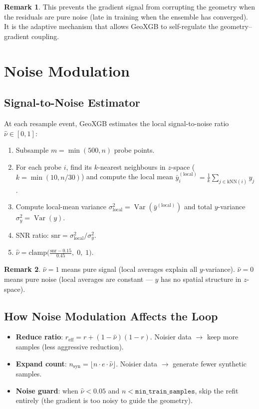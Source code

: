 \documentclass[11pt,a4paper]{article}
\newcommand{\Var}{\operatorname{Var}}
\theoremstyle{definition}
\newtheorem{remark}{Remark}
\begin{document}
\begin{remark}
This prevents the gradient signal from corrupting the geometry when the
residuals are pure noise (late in training when the ensemble has converged).
It is the adaptive mechanism that allows GeoXGB to self-regulate the
geometry--gradient coupling.
\end{remark}


\section{Noise Modulation}
\label{sec:noise}

\subsection{Signal-to-Noise Estimator}

At each resample event, GeoXGB estimates the local signal-to-noise ratio
$\hat{\nu} \in [0, 1]$:

\begin{enumerate}[nosep]
    \item Subsample $m = \min(500, n)$ probe points.
    \item For each probe $i$, find its $k$-nearest neighbours in $z$-space
        ($k = \min(10, n/30)$) and compute the local mean
        $\bar{y}_i^{(\text{local})} = \frac{1}{k}\sum_{j \in \text{kNN}(i)} y_j$.
    \item Compute local-mean variance $\sigma_{\text{local}}^2 = \Var(\bar{y}^{(\text{local})})$
        and total $y$-variance $\sigma_y^2 = \Var(y)$.
    \item SNR ratio: $\text{snr} = \sigma_{\text{local}}^2 / \sigma_y^2$.
    \item $\hat{\nu} = \text{clamp}\!\bigl(\frac{\text{snr} - 0.15}{0.45},\; 0,\; 1\bigr)$.
\end{enumerate}

\begin{remark}
$\hat{\nu} = 1$ means pure signal (local averages explain all $y$-variance).
$\hat{\nu} = 0$ means pure noise (local averages are constant --- $y$ has
no spatial structure in $z$-space).
\end{remark}

\subsection{How Noise Modulation Affects the Loop}

\begin{itemize}[nosep]
    \item \textbf{Reduce ratio}: $r_{\text{eff}} = r + (1 - \hat{\nu})(1 - r)$.
        Noisier data $\to$ keep more samples (less aggressive reduction).
    \item \textbf{Expand count}: $n_{\text{syn}} = \lfloor n \cdot e \cdot \hat{\nu} \rfloor$.
        Noisier data $\to$ generate fewer synthetic samples.
    \item \textbf{Noise guard}: when $\hat{\nu} < 0.05$ and $n < \texttt{min\_train\_samples}$,
        skip the refit entirely (the gradient is too noisy to guide the geometry).
\end{itemize}
\end{document}
